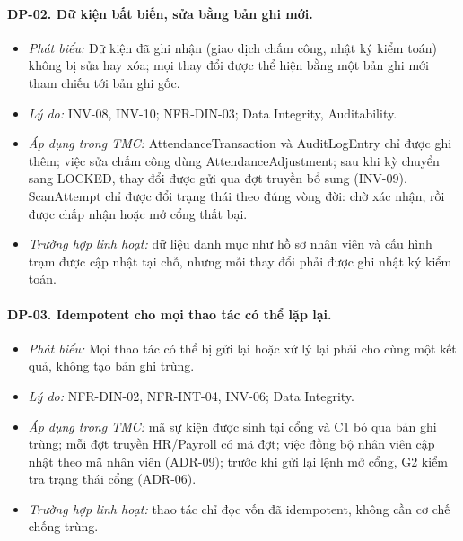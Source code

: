 \paragraph{DP-02. Dữ kiện bất biến, sửa bằng bản ghi mới.}\label{dp:02}
\begin{itemize}
    \item \textit{Phát biểu:} Dữ kiện đã ghi nhận (giao dịch chấm công, nhật ký kiểm toán) không bị sửa hay xóa; mọi thay đổi được thể hiện bằng một bản ghi mới tham chiếu tới bản ghi gốc.
    \item \textit{Lý do:} INV-08, INV-10; NFR-DIN-03; Data Integrity, Auditability.
    \item \textit{Áp dụng trong TMC:} AttendanceTransaction và AuditLogEntry chỉ được ghi thêm; việc sửa chấm công dùng AttendanceAdjustment; sau khi kỳ chuyển sang LOCKED, thay đổi được gửi qua đợt truyền bổ sung (INV-09). ScanAttempt chỉ được đổi trạng thái theo đúng vòng đời: chờ xác nhận, rồi được chấp nhận hoặc mở cổng thất bại.
    \item \textit{Trường hợp linh hoạt:} dữ liệu danh mục như hồ sơ nhân viên và cấu hình trạm được cập nhật tại chỗ, nhưng mỗi thay đổi phải được ghi nhật ký kiểm toán.
\end{itemize}

\paragraph{DP-03. Idempotent cho mọi thao tác có thể lặp lại.}\label{dp:03}
\begin{itemize}
    \item \textit{Phát biểu:} Mọi thao tác có thể bị gửi lại hoặc xử lý lại phải cho cùng một kết quả, không tạo bản ghi trùng.
    \item \textit{Lý do:} NFR-DIN-02, NFR-INT-04, INV-06; Data Integrity.
    \item \textit{Áp dụng trong TMC:} mã sự kiện được sinh tại cổng và C1 bỏ qua bản ghi trùng; mỗi đợt truyền HR/Payroll có mã đợt; việc đồng bộ nhân viên cập nhật theo mã nhân viên (ADR-09); trước khi gửi lại lệnh mở cổng, G2 kiểm tra trạng thái cổng (ADR-06).
    \item \textit{Trường hợp linh hoạt:} thao tác chỉ đọc vốn đã idempotent, không cần cơ chế chống trùng.
\end{itemize}

